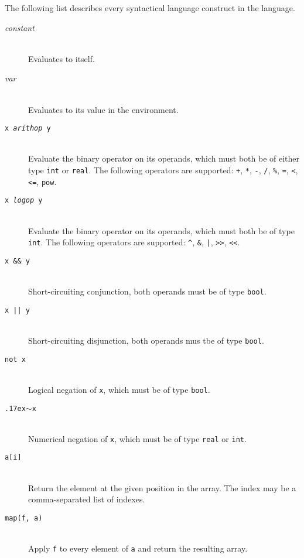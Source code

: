\documentclass[oneside]{memoir}
\newcommand\boolt[0]{\texttt{bool}}
\newcommand\realt[0]{\texttt{real}}
\newcommand\intt[0]{\texttt{int}}
\renewcommand\tilde[0]{{\raise.17ex\hbox{$\scriptstyle\sim$}}}
\begin{document}
The following list describes every syntactical language construct in
the language.

\begin{description}
  \item[\textit{constant}]\hfill\\
    Evaluates to itself.

  \item[\textit{var}]\hfill\\
    Evaluates to its value in the environment.

  \item[\texttt{x \textit{arithop} y}] \hfill\\
    Evaluate the binary operator on its operands, which must both be of either type \intt{} or \realt.  The following operators are supported: \texttt{+}, \texttt{*}, \texttt{-}, \texttt{/}, \texttt{\%}, \texttt{=}, \texttt{<}, \texttt{<=}, \texttt{pow}.

  \item[\texttt{x \textit{logop} y}] \hfill\\
    Evaluate the binary operator on its operands, which must both be of type \intt.  The following operators are supported: \texttt{\^}, \texttt{\&}, \texttt{|}, \texttt{>>}, \texttt{<<}.

  \item[\texttt{x \&\& y}]\hfill\\
    Short-circuiting conjunction, both operands must be of type \boolt.

  \item[\texttt{x || y}]\hfill\\
    Short-circuiting disjunction, both operands mus tbe of type \boolt.

  \item[\texttt{not x}]\hfill\\
    Logical negation of \texttt{x}, which must be of type \boolt.

  \item[\texttt{\tilde x}]\hfill\\
    Numerical negation of \texttt{x}, which must be of type \realt{} or \intt.

  \item[\texttt{a[i]}]\hfill\\
    Return the element at the given position in the array.  The index
    may be a comma-separated list of indexes.

  \item[\texttt{map(f, a)}]\hfill\\
    Apply \texttt{f} to every element of \texttt{a} and return the resulting array.


\end{description}
\end{document}
